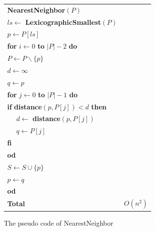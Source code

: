       \begin{figure}
        \begin{tabular}{l r}
          \textbf{NearestNeighbor}$(P)$                                               & \\
          $ls \gets$ \textbf{LexicographicSmallest}$(P)$                              & \\
          $p \gets P[ls]$                                                             & \\
          \textbf{for} $i \gets 0$ \textbf{to} $|P| - 2$ \textbf{do}                  & \\
          \qquad $P \gets P \backslash \{ p \}$                                       & \\
          \qquad $d \gets \infty$                                                     & \\
          \qquad $q \gets p $                                                         & \\
          \qquad \textbf{for} $j \gets 0$ \textbf{to} $|P| - 1$ \textbf{do}           & \\
          \qquad \qquad \textbf{if} \textbf{distance}$(p, P[j]) < d$ \textbf{then}    & \\
          \qquad \qquad ~~ $d \gets$ \textbf{distance}$(p, P[j])$                     & \\
           \qquad \qquad ~~ $q \gets P[j]$                                            & \\
           \qquad \qquad \textbf{fi}                                                  & \\
           \qquad \textbf{od}                                                         & \\
           $S \gets S \cup \{ p \}$                                                   & \\
           $p \gets q$                                                                & \\
           \textbf{od}                                                                & \\ \hline \hline
           \qquad \qquad \qquad\qquad\qquad\qquad\qquad \textbf{Total }  & $O(n^{2})$
         \end{tabular}
         \label{fig:NearestNeigborcode}
         \caption{The pseudo code of NearestNeighbor}
      \end{figure}
    
